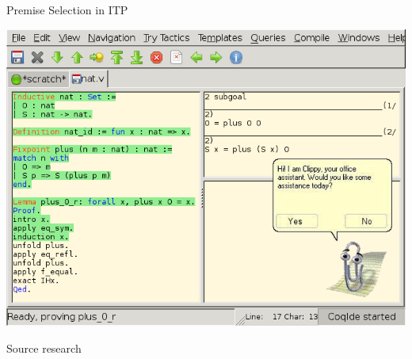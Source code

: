\documentclass[department=ds, notes={hide notes}, slidesperpage=1]{beamerruhuisstijl}
\begin{document}
\begin{frame}{Premise Selection in ITP}
	\begin{center}
		\includegraphics[height=0.78\textheight]{figures/coqide-clippy.png}
	\end{center}
\end{frame}

\begin{frame}{Source research}
	\begin{center}
	\end{center}
\end{frame}
\end{document}
